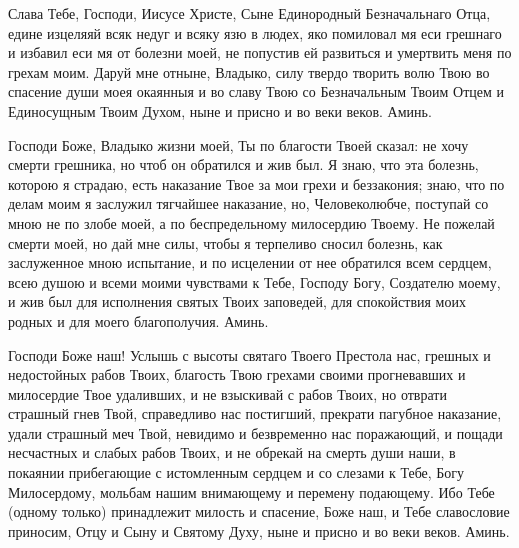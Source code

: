 \begin{mymulticols}
 


Слава Тебе, Господи, Иисусе Христе, Сыне Единородный Безначальнаго Отца, едине изцеляяй всяк недуг и всяку язю в людех, яко помиловал мя еси грешнаго и избавил еси мя от болезни моей, не попустив ей развиться и умертвить меня по грехам моим. Даруй мне отныне, Владыко, силу твердо творить волю Твою во спасение души моея окаянныя и во славу Твою со Безначальным Твоим Отцем и Единосущным Твоим Духом, ныне и присно и во веки веков. Аминь.




\end{mymulticols}

\mychapterending


\begin{mymulticols}
 


Господи Боже, Владыко жизни моей, Ты по благости Твоей сказал: не хочу смерти грешника, но чтоб он обратился и жив был. Я знаю, что эта болезнь, которою я страдаю, есть наказание Твое за мои грехи и беззакония; знаю, что по делам моим я заслужил тягчайшее наказание, но, Человеколюбче, поступай со мною не по злобе моей, а по беспредельному милосердию Твоему. Не пожелай смерти моей, но дай мне силы, чтобы я терпеливо сносил болезнь, как заслуженное мною испытание, и по исцелении от нее обратился всем сердцем, всею душою и всеми моими чувствами к Тебе, Господу Богу, Создателю моему, и жив был для исполнения святых Твоих заповедей, для спокойствия моих родных и для моего благополучия. Аминь. 




\end{mymulticols}

\mychapterending


\begin{mymulticols}
 




Господи Боже наш! Услышь с высоты святаго Твоего Престола нас, грешных и недостойных рабов Твоих, благость Твою грехами своими прогневавших и милосердие Твое удаливших, и не взыскивай с рабов Твоих, но отврати страшный гнев Твой, справедливо нас постигший, прекрати пагубное наказание, удали страшный меч Твой, невидимо и безвременно нас поражающий, и пощади несчастных и слабых рабов Твоих, и не обрекай на смерть души наши, в покаянии прибегающие с истомленным сердцем и со слезами к Тебе, Богу Милосердому, мольбам нашим внимающему и перемену подающему. Ибо Тебе (одному только) принадлежит милость и спасение, Боже наш, и Тебе славословие приносим, Отцу и Сыну и Святому Духу, ныне и присно и во веки веков. Аминь.




\end{mymulticols}


